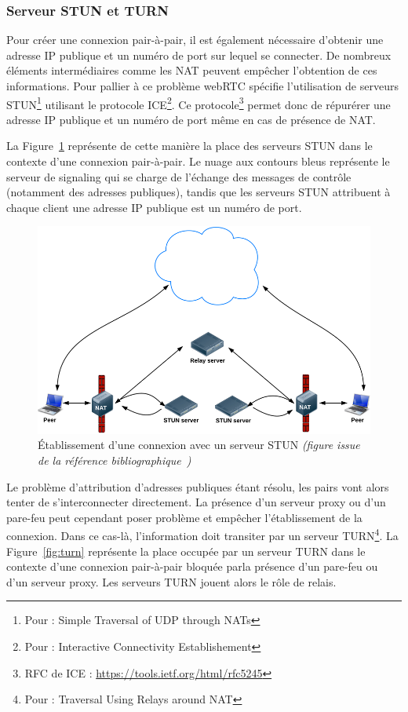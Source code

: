 \documentclass{tnreport}
\begin{document}
\subsubsection{Serveur STUN et TURN}

Pour créer une connexion pair-à-pair, il est également nécessaire d'obtenir une adresse IP publique et un numéro de port sur lequel se connecter. De nombreux éléments intermédiaires comme les NAT peuvent empêcher l'obtention de ces informations. Pour pallier à ce problème webRTC spécifie l'utilisation de serveurs STUN\footnote{Pour : Simple Traversal of UDP through NATs} utilisant le protocole ICE\footnote{Pour : Interactive Connectivity Establishement}. Ce protocole\footnote{RFC de ICE : \url{https://tools.ietf.org/html/rfc5245}} permet donc de répurérer une adresse IP publique et un numéro de port même en cas de présence de NAT.

La Figure~\ref{fig:stun} représente de cette manière la place des serveurs STUN dans le contexte d'une connexion pair-à-pair. Le nuage aux contours bleus représente le serveur de signaling qui se charge de l'échange des messages de contrôle (notamment des adresses publiques), tandis que les serveurs STUN attribuent à chaque client une adresse IP publique est un numéro de port.

\begin{figure}[!h]
  \centering
  \includegraphics[width=14cm]{figures/stun}
  \caption{Établissement d'une connexion avec un serveur STUN \emph{(figure issue de la référence bibliographique~\cite{GettingStartedwithWebRTC})}}
  \label{fig:stun}
\end{figure}

Le problème d'attribution d'adresses publiques étant résolu, les pairs vont alors tenter de s'interconnecter directement. La présence d'un serveur proxy ou d'un pare-feu peut cependant poser problème et empêcher l'établissement de la connexion. Dans ce cas-là, l'information doit transiter par un serveur TURN\footnote{Pour : Traversal Using Relays around NAT}. La Figure~\ref{fig:turn} représente la place occupée par un serveur TURN dans le contexte d'une connexion pair-à-pair bloquée parla présence d'un pare-feu ou d'un serveur proxy. Les serveurs TURN jouent alors le rôle de relais.
\end{document}
